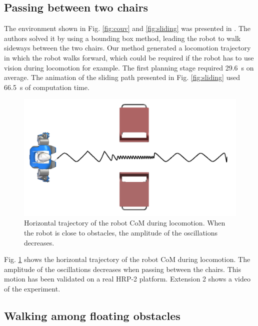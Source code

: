 \documentclass{article}
\begin{document}
\subsection{Passing between two chairs}

The environment shown in Fig. \ref{fig:couv} and \ref{fig:sliding} was
presented in \cite{el2011path}. The  authors solved it by using a bounding
box method, leading the robot to walk sideways between the two chairs.
Our method generated a locomotion  trajectory in which the robot walks
forward, which could be required if the robot has to use vision during
locomotion for  example. The first planning stage  required 29.6~s
on  average.   The  animation  of   the  sliding  path   presented  in
Fig.   \ref{fig:sliding}    used   66.5~s  of  computation   time.


\begin{figure}[h!]
\centering
\includegraphics[width=0.7\linewidth]{pics/chairs/waist-trajectory.png}

\caption{Horizontal trajectory of the robot CoM during
  locomotion. When the robot is close to obstacles, the amplitude of
  the oscillations decreases.}
\label{fig:chairs-waist}
\end{figure}



Fig.  \ref{fig:chairs-waist} shows  the horizontal  trajectory  of the
robot CoM  during  locomotion. The amplitude of the oscillations  decreases when passing
between the  chairs.  This motion has  been validated on  a real HRP-2
platform. Extension 2 shows a video of the experiment.


\subsection{Walking among floating obstacles}
\end{document}
